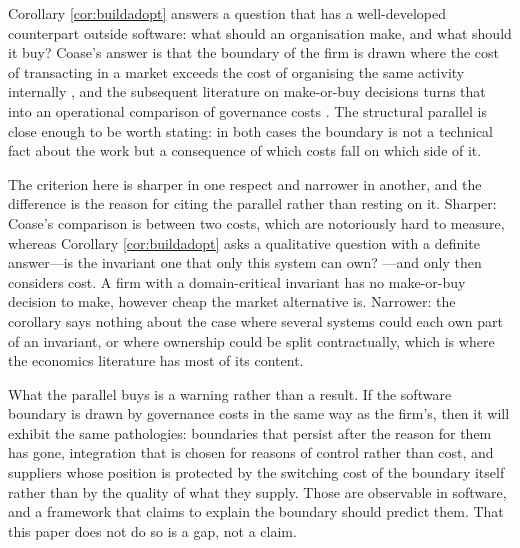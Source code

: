 \begin{remark}\label{rmk:coase}
Corollary \ref{cor:buildadopt} answers a question that has a well-developed counterpart outside
software: what should an organisation make, and what should it buy? Coase's answer is that the
boundary of the firm is drawn where the cost of transacting in a market exceeds the cost of
organising the same activity internally \cite{coase1937}, and the subsequent literature on
make-or-buy decisions turns that into an operational comparison of governance costs
\cite{williamson1985}. The structural parallel is close enough to be worth stating: in both cases
the boundary is not a technical fact about the work but a consequence of which costs fall on which
side of it.

The criterion here is sharper in one respect and narrower in another, and the difference is the
reason for citing the parallel rather than resting on it. Sharper: Coase's comparison is between
two costs, which are notoriously hard to measure, whereas Corollary \ref{cor:buildadopt} asks a
qualitative question with a definite answer---is the invariant one that only this system can own?
---and only then considers cost. A firm with a domain-critical invariant has no make-or-buy
decision to make, however cheap the market alternative is. Narrower: the corollary says nothing
about the case where several systems could each own part of an invariant, or where ownership could
be split contractually, which is where the economics literature has most of its content.

What the parallel buys is a warning rather than a result. If the software boundary is drawn by
governance costs in the same way as the firm's, then it will exhibit the same pathologies:
boundaries that persist after the reason for them has gone, integration that is chosen for
reasons of control rather than cost, and suppliers whose position is protected by the switching
cost of the boundary itself rather than by the quality of what they supply. Those are observable
in software, and a framework that claims to explain the boundary should predict them. That this
paper does not do so is a gap, not a claim.
\end{remark}

